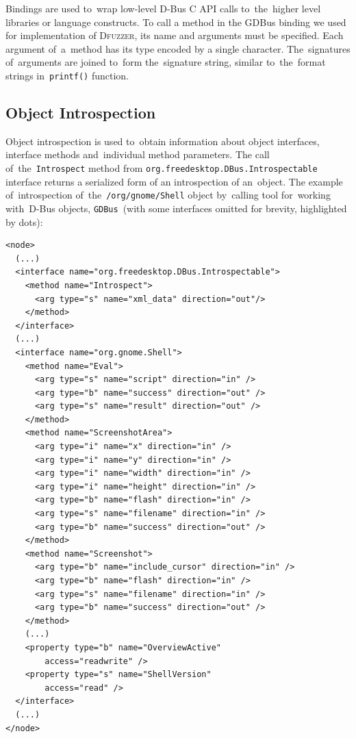 \documentclass[conference]{IEEEtran}
\begin{document}
Bindings are used to~wrap low-level D-Bus C API calls to~the~higher level
libraries or language constructs. To call a method in the GDBus binding we used
for implementation of \textsc{Dfuzzer}, its name and arguments must be specified. Each
argument of~a~method has its type encoded by a single character. The~signatures
of~arguments are joined to~form the~signature string, similar to~the~format
strings in~\texttt{printf()} function.

\subsection{Object Introspection}

Object introspection is used to~obtain information about object interfaces,
interface methods and~individual method parameters. The call
of~the~\texttt{Introspect} method from
\texttt{org.freedesktop.DBus.Introspectable} interface returns a serialized
form of an introspection of an~object. The example of~introspection
of~the~\texttt{/org/gnome/Shell} object by~calling tool for~working with~D-Bus
objects, \texttt{GDBus}~(with some interfaces omitted for brevity, highlighted
by dots):

{\scriptsize
\begin{verbatim}
<node>
  (...)
  <interface name="org.freedesktop.DBus.Introspectable">
    <method name="Introspect">
      <arg type="s" name="xml_data" direction="out"/>
    </method>
  </interface>
  (...)
  <interface name="org.gnome.Shell">
    <method name="Eval">
      <arg type="s" name="script" direction="in" />
      <arg type="b" name="success" direction="out" />
      <arg type="s" name="result" direction="out" />
    </method>
    <method name="ScreenshotArea">
      <arg type="i" name="x" direction="in" />
      <arg type="i" name="y" direction="in" />
      <arg type="i" name="width" direction="in" />
      <arg type="i" name="height" direction="in" />
      <arg type="b" name="flash" direction="in" />
      <arg type="s" name="filename" direction="in" />
      <arg type="b" name="success" direction="out" />
    </method>
    <method name="Screenshot">
      <arg type="b" name="include_cursor" direction="in" />
      <arg type="b" name="flash" direction="in" />
      <arg type="s" name="filename" direction="in" />
      <arg type="b" name="success" direction="out" />
    </method>
    (...)
    <property type="b" name="OverviewActive"
        access="readwrite" />
    <property type="s" name="ShellVersion"
        access="read" />
  </interface>
  (...)
</node>
\end{verbatim}
}
\end{document}
